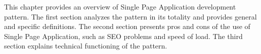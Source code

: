 This chapter provides an overview of Single Page Application development pattern. The first section analyzes the pattern in its totality and provides general and specific definitions. The second section presents pros and cons of the use of Single Page Application, such as SEO problems and speed of load. The third section explains technical functioning of the pattern. 
